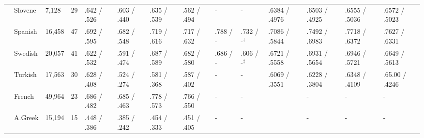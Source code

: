 \begin{landscape}
\begin{table}[ht]
\begin{tabular}{|l|l|l|l|p{1.5cm}|p{1.5cm}|p{1.5cm}|p{1.5cm}|p{1.5cm}|p{2cm}|p{2cm}|p{2cm}|p{2cm}|p{2cm}|}
        & Slovene    & 7,128   & 29   & .642 / .526   & .603 / .440   & .635 / .539   & .562 / .494   & -           & - & .6384 / .4976 & .6503 / .4925  & .6555 / .5036     & .6572 / .5023 \\
        & Spanish    & 16,458  & 47   & .692 / .595   & .682 / .548   & .719 / .616   & .717 / .632   & .788 / -    & .732 / -$^\dagger$& .7086 / .5844 & .7492 / .6983  & .7718 / .6372     & .7627 / .6331 \\
        & Swedish    & 20,057  & 41   & .622 / .532   & .591 / .474   & .687 / .589   & .682 / .580   & .686 / -    & .606 / -$^\ddagger$& .6721 / .5558 & .6931 / .5654  & .6946 / .5721     & .6649 / .5613 \\
        & Turkish    & 17,563  & 30   & .628 / .408   & .524 / .274   & .581 / .368   & .587 / .402   & -           & - & .6069 / .3551 & .6228 / .3804  & .6348 / .4109    & .65.00 / .4246 \\ \hline %
        & French     & 49,964  & 23   & .686 / .482   & .685 / .463   & .778 / .573   & .766 / .550   & -           & - & & - & -               & -        \\
        & A.Greek    & 15,194  & 15   & .448 / .386   & .385 / .242   & .454 / .333  & .451 / .405    & -           & - & & - & -               & -        \\ \hline
    \end{tabular}
\end{table}
\end{landscape}
